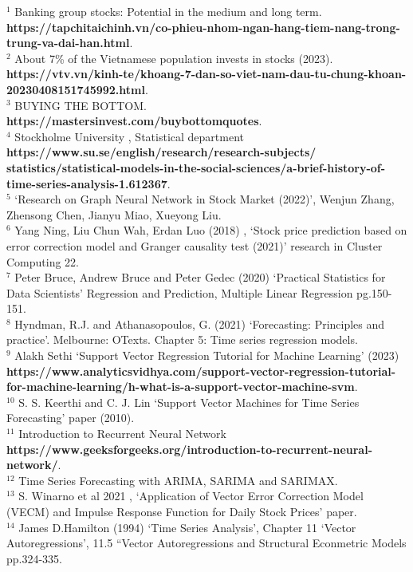 \documentclass{ieeeojies}
\begin{document}



$^1$ Banking group stocks: Potential in the medium and long term. \\ \textbf{{https://tapchitaichinh.vn/co-phieu-nhom-ngan-hang-tiem-nang-trong-trung-va-dai-han.html}}.\\
$^2$ About 7\% of the Vietnamese population invests in stocks (2023). \\ \textbf{https://vtv.vn/kinh-te/khoang-7-dan-so-viet-nam-dau-tu-chung-khoan-20230408151745992.html}. \\
$^3$ BUYING THE BOTTOM. \\ \textbf{https://mastersinvest.com/buybottomquotes}. \\
$^4$ Stockholme University , Statistical department\\
\textbf{https://www.su.se/english/research/research-subjects/}\\
\textbf{statistics/statistical-models-in-the-social-sciences/a-brief-history-of-time-series-analysis-1.612367}.
 \\
$^5$ ‘Research on Graph Neural Network in Stock Market (2022)’, Wenjun Zhang, Zhensong Chen, Jianyu Miao, Xueyong Liu. 
 \\
$^6$ Yang Ning, Liu Chun Wah, Erdan Luo (2018) , ‘Stock price prediction based on error correction model and Granger causality test (2021)’ research in Cluster Computing 22. \\
$^7$ Peter Bruce, Andrew Bruce and Peter Gedec (2020) ‘Practical Statistics for Data Scientists’ Regression and Prediction, Multiple Linear Regression pg.150-151.\\
$^8$ Hyndman, R.J. and Athanasopoulos, G. (2021) ‘Forecasting: Principles and practice’. Melbourne: OTexts. Chapter 5: Time series regression models.\\
$^9$ Alakh Sethi ‘Support Vector Regression Tutorial for Machine Learning’ (2023) \\ \textbf{https://www.analyticsvidhya.com/support-vector-regression-tutorial-for-machine-learning/h-what-is-a-support-vector-machine-svm}.\\
$^{10}$ S. S. Keerthi and C. J. Lin  ‘Support Vector Machines for Time Series Forecasting’ paper (2010).\\
$^{11}$ Introduction to Recurrent Neural Network\\
\textbf{https://www.geeksforgeeks.org/introduction-to-recurrent-neural-network/}.
 \\
$^{12}$ Time Series Forecasting with ARIMA, SARIMA and SARIMAX. \\
$^{13}$ S. Winarno et al 2021 , ‘Application of Vector Error Correction Model (VECM) and Impulse Response Function for Daily Stock Prices’ paper. \\
$^{14}$ James D.Hamilton (1994) ‘Time Series Analysis’, Chapter 11 ‘Vector Autoregressions’, 11.5 “Vector Autoregressions and Structural Econmetric Models pp.324-335. \\
 
\EOD
\end{document}
